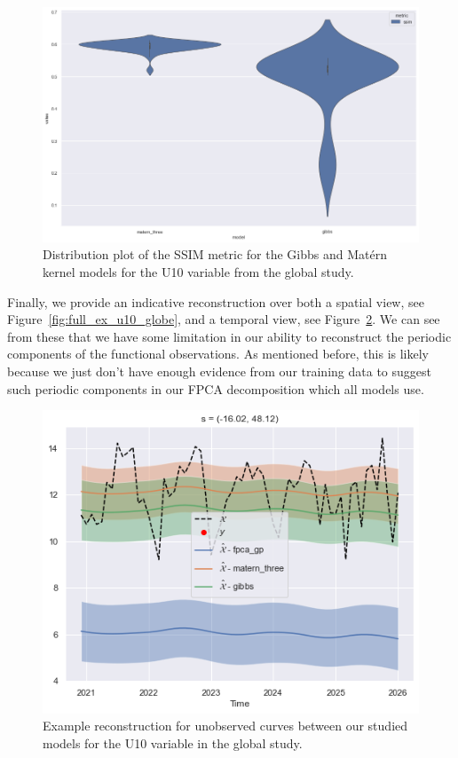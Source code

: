 \begin{figure}
	\centering
	\includegraphics[width=\textwidth]{cesm_u10_dist}
	\caption{Distribution plot of the SSIM metric for the Gibbs and Mat\'ern kernel models for the U10 variable from the global study.}
	\label{fig:cesm_u10_dist}
\end{figure}

Finally, we provide an indicative reconstruction over both a spatial view, see Figure~\ref{fig:full_ex_u10_globe}, and a temporal view, see Figure~\ref{fig:test_ex_u10_globe}.
We can see from these that we have some limitation in our ability to reconstruct the periodic components of the functional observations.
As mentioned before, this is likely because we just don't have enough evidence from our training data to suggest such periodic components in our FPCA decomposition which all models use.

\begin{figure}
\centering
\includegraphics[width=\textwidth]{test_ex_u10_globe}
\caption{Example reconstruction for unobserved curves between our studied models for the U10 variable in the global study.}
\label{fig:test_ex_u10_globe}
\end{figure}

